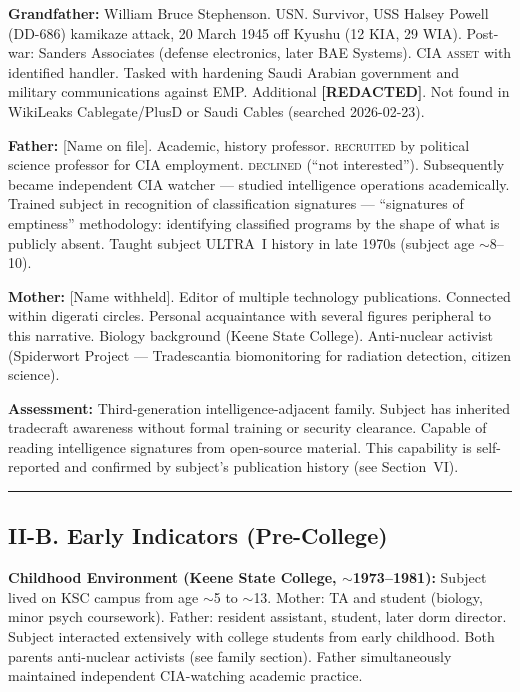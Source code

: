\textbf{Grandfather:} William Bruce Stephenson. USN. Survivor, USS Halsey Powell (DD-686) kamikaze attack, 20 March 1945 off Kyushu (12 KIA, 29 WIA). Post-war: Sanders Associates (defense electronics, later BAE Systems). CIA \textsc{asset} with identified handler. Tasked with hardening Saudi Arabian government and military communications against EMP. Additional \textbf{[REDACTED]}. Not found in WikiLeaks Cablegate/PlusD or Saudi Cables (searched 2026-02-23).

\textbf{Father:} [Name on file]. Academic, history professor. \textsc{recruited} by political science professor for CIA employment. \textsc{declined} (``not interested''). Subsequently became independent CIA watcher --- studied intelligence operations academically. Trained subject in recognition of classification signatures --- ``signatures of emptiness'' methodology: identifying classified programs by the shape of what is publicly absent. Taught subject ULTRA~I history in late 1970s (subject age $\sim$8--10).

\textbf{Mother:} [Name withheld]. Editor of multiple technology publications. Connected within digerati circles. Personal acquaintance with several figures peripheral to this narrative. Biology background (Keene State College). Anti-nuclear activist (Spiderwort Project --- Tradescantia biomonitoring for radiation detection, citizen science).

\textbf{Assessment:} Third-generation intelligence-adjacent family. Subject has inherited tradecraft awareness without formal training or security clearance. Capable of reading intelligence signatures from open-source material. This capability is self-reported and confirmed by subject's publication history (see Section~VI).

\vspace{1cm}\hrule\vspace{1cm}

\subsection*{II-B. Early Indicators (Pre-College)}
\label{interlude:early-indicators-pre-college}

\textbf{Childhood Environment (Keene State College, $\sim$1973--1981):} Subject lived on KSC campus from age $\sim$5 to $\sim$13. Mother: TA and student (biology, minor psych coursework). Father: resident assistant, student, later dorm director. Subject interacted extensively with college students from early childhood. Both parents anti-nuclear activists (see family section). Father simultaneously maintained independent CIA-watching academic practice.

